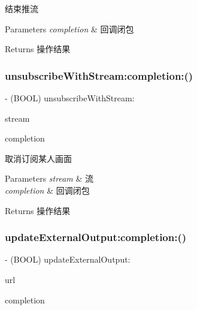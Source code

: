 结束推流 
\begin{DoxyParams}{Parameters}
{\em completion} & 回调闭包 \\
\hline
\end{DoxyParams}
\begin{DoxyReturn}{Returns}
操作结果 
\end{DoxyReturn}
\mbox{\label{interface_c_c_streamer_basic_a84d647ce0824c172ae3a9ee95676ccb6}} 
\subsubsection{\texorpdfstring{unsubscribe\+With\+Stream\+:completion\+:()}{unsubscribeWithStream:completion:()}}
{\footnotesize\ttfamily -\/ (B\+O\+OL) unsubscribe\+With\+Stream\+: \begin{DoxyParamCaption}\item[{(\hyperlink{interface_c_c_stream}{C\+C\+Stream} $\ast$)}]{stream }\item[{completion:(C\+C\+Comletion\+Block)}]{completion }\end{DoxyParamCaption}}

取消订阅某人画面 
\begin{DoxyParams}{Parameters}
{\em stream} & 流 \\
\hline
{\em completion} & 回调闭包 \\
\hline
\end{DoxyParams}
\begin{DoxyReturn}{Returns}
操作结果 
\end{DoxyReturn}
\mbox{\label{interface_c_c_streamer_basic_af73255187458b1385508cef508131458}} 
\subsubsection{\texorpdfstring{update\+External\+Output\+:completion\+:()}{updateExternalOutput:completion:()}}
{\footnotesize\ttfamily -\/ (B\+O\+OL) update\+External\+Output\+: \begin{DoxyParamCaption}\item[{(N\+S\+String $\ast$)}]{url }\item[{completion:(C\+C\+Comletion\+Block)}]{completion }\end{DoxyParamCaption}}

